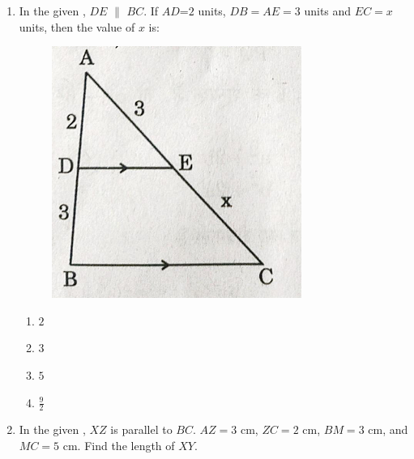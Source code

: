 \begin{enumerate}
   
\item  In the given , $DE$ $\parallel$ $BC$. If $AD$=$2$ units, $DB=AE=3$ units and $EC=x$ units, then the value of $x$ is:
\begin{figure}[H]
    \centering
    \includegraphics[width=\columnwidth]{figs/fig6.png}
    \caption{}
    \label{fig:figure1}
\end{figure}

\begin{enumerate}
    \item $2$ \item $3$ \item $5$ \item $\frac{9}{2}$
\end{enumerate}
\item In the given , $XZ$ is parallel to $BC$. $AZ = 3$ cm, $ZC = 2$ cm, $BM = 3$ cm, and $MC = 5$ cm. Find the length of $XY$.


\end{enumerate}
